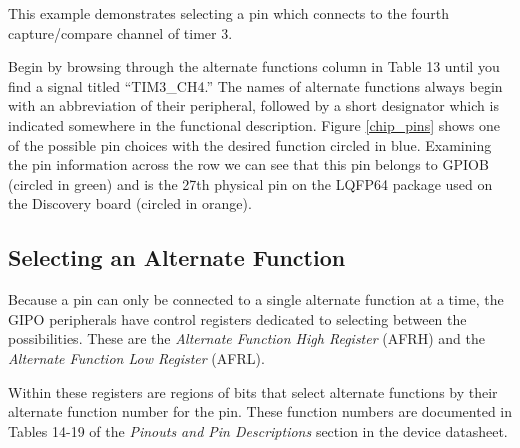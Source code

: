 \documentclass[openany,11pt,fleqn]{book} %
\begin{document}
    \begin{example}
        \label{example2}
            This example demonstrates selecting a pin which connects to the fourth capture/compare channel of timer 3. 
            
            Begin by browsing through the alternate functions column in Table 13 until you find a signal titled ``TIM3\_CH4.'' The names of alternate functions always begin with an abbreviation of their peripheral, followed by a short designator which is indicated somewhere in the functional description. Figure \ref{chip_pins} shows one of the possible pin choices with the desired function circled in blue. Examining the pin information across the row we can see that this pin belongs to GPIOB (circled in green) and is the 27th physical pin on the LQFP64 package used on the Discovery board (circled in orange).
        
    \end{example}
    
    \subsection{Selecting an Alternate Function}
    Because a pin can only be connected to a single alternate function at a time, the GIPO peripherals have control registers dedicated to selecting between the possibilities. These are the \textit{Alternate Function High Register} (AFRH) and the  \textit{Alternate Function Low Register} (AFRL). 
    
    Within these registers are regions of bits that select alternate functions by their alternate function number for the pin. These function numbers are documented in Tables 14-19 of the \textit{Pinouts and Pin Descriptions} section in the device datasheet. 
%    
\end{document}
